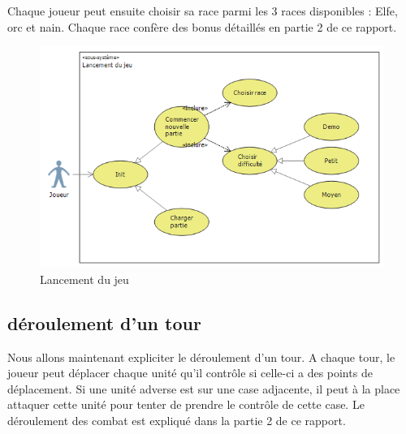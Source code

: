 Chaque joueur peut ensuite choisir sa race parmi les 3 races disponibles : Elfe, orc et nain. Chaque race confère des bonus détaillés en partie 2 de ce rapport.

\begin{figure}[!h]
\centering
\label{lancement}
\includegraphics[width=1\textwidth]{img/LancementDuJeu.png}
\caption{Lancement du jeu}
\end{figure}

\subsection{déroulement d'un tour}

Nous allons maintenant expliciter le déroulement d'un tour. A chaque tour, le joueur peut déplacer chaque unité qu'il contrôle si celle-ci a des points de déplacement. Si une unité adverse est sur une case adjacente, il peut à la place attaquer cette unité pour tenter de prendre le contrôle de cette case. Le déroulement des combat est expliqué dans la partie 2 de ce rapport.


